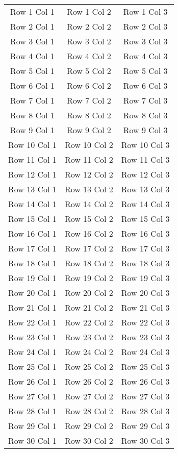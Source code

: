 \begin{longtable}{|c|c|c|}
    Row 1 Col 1 & Row 1 Col 2 & Row 1 Col 3 \\
    Row 2 Col 1 & Row 2 Col 2 & Row 2 Col 3 \\
    Row 3 Col 1 & Row 3 Col 2 & Row 3 Col 3 \\
    Row 4 Col 1 & Row 4 Col 2 & Row 4 Col 3 \\
    Row 5 Col 1 & Row 5 Col 2 & Row 5 Col 3 \\
    Row 6 Col 1 & Row 6 Col 2 & Row 6 Col 3 \\
    Row 7 Col 1 & Row 7 Col 2 & Row 7 Col 3 \\
    Row 8 Col 1 & Row 8 Col 2 & Row 8 Col 3 \\
    Row 9 Col 1 & Row 9 Col 2 & Row 9 Col 3 \\
    Row 10 Col 1 & Row 10 Col 2 & Row 10 Col 3 \\
    Row 11 Col 1 & Row 11 Col 2 & Row 11 Col 3 \\
    Row 12 Col 1 & Row 12 Col 2 & Row 12 Col 3 \\
    Row 13 Col 1 & Row 13 Col 2 & Row 13 Col 3 \\
    Row 14 Col 1 & Row 14 Col 2 & Row 14 Col 3 \\
    Row 15 Col 1 & Row 15 Col 2 & Row 15 Col 3 \\
    Row 16 Col 1 & Row 16 Col 2 & Row 16 Col 3 \\
    Row 17 Col 1 & Row 17 Col 2 & Row 17 Col 3 \\
    Row 18 Col 1 & Row 18 Col 2 & Row 18 Col 3 \\
    Row 19 Col 1 & Row 19 Col 2 & Row 19 Col 3 \\
    Row 20 Col 1 & Row 20 Col 2 & Row 20 Col 3 \\
    Row 21 Col 1 & Row 21 Col 2 & Row 21 Col 3 \\
    Row 22 Col 1 & Row 22 Col 2 & Row 22 Col 3 \\
    Row 23 Col 1 & Row 23 Col 2 & Row 23 Col 3 \\
    Row 24 Col 1 & Row 24 Col 2 & Row 24 Col 3 \\
    Row 25 Col 1 & Row 25 Col 2 & Row 25 Col 3 \\
    Row 26 Col 1 & Row 26 Col 2 & Row 26 Col 3 \\
    Row 27 Col 1 & Row 27 Col 2 & Row 27 Col 3 \\
    Row 28 Col 1 & Row 28 Col 2 & Row 28 Col 3 \\
    Row 29 Col 1 & Row 29 Col 2 & Row 29 Col 3 \\
    Row 30 Col 1 & Row 30 Col 2 & Row 30 Col 3 \\
\end{longtable}


